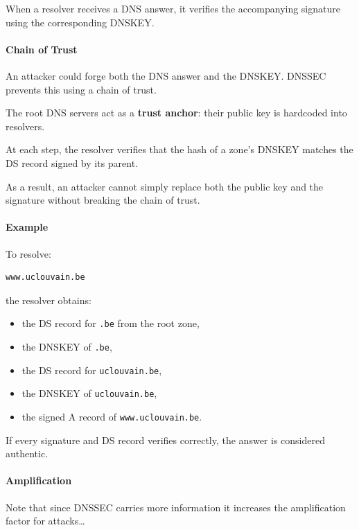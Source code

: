 When a resolver receives a DNS answer, it verifies the accompanying signature using the corresponding DNSKEY.

\paragraph{Chain of Trust}

An attacker could forge both the DNS answer and the DNSKEY. DNSSEC prevents this using a chain of trust.

The root DNS servers act as a \textbf{trust anchor}: their public key is hardcoded into resolvers.


At each step, the resolver verifies that the hash of a zone's DNSKEY matches the DS record signed by its parent.

As a result, an attacker cannot simply replace both the public key and the signature without breaking the chain of trust.

\paragraph{Example}

To resolve:

\begin{lstlisting}
www.uclouvain.be
\end{lstlisting}

the resolver obtains:

\begin{itemize}
    \item the DS record for \texttt{.be} from the root zone,
    \item the DNSKEY of \texttt{.be},
    \item the DS record for \texttt{uclouvain.be},
    \item the DNSKEY of \texttt{uclouvain.be},
    \item the signed A record of \texttt{www.uclouvain.be}.
\end{itemize}

If every signature and DS record verifies correctly, the answer is considered authentic.

\paragraph{Amplification} Note that since DNSSEC carries more information it increases the amplification factor for attacks\dots

